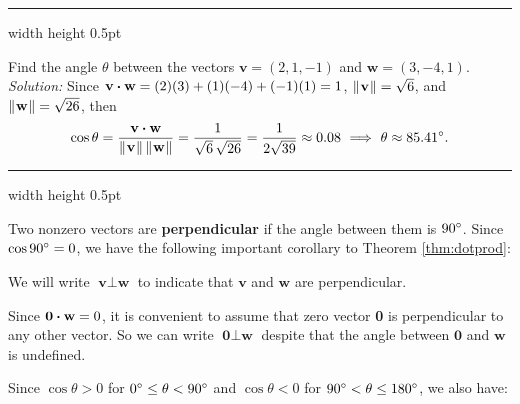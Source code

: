 \hrule width \textwidth height 0.5pt
\begin{exmp}
 Find the angle $\theta$ between the vectors $\textbf{v} = (2,1,-1)$ and $\textbf{w} =
 (3,-4,1)$.\smallskip
 \\\emph{Solution:}
 Since $\textbf{v} \bm{\cdot} \textbf{w} = (2)(3) + (1)(-4) + (-1)(1) = 1$,
 $\lVert\mspace{1mu}\textbf{v}\mspace{1mu}\rVert = \sqrt{6}$, and $\lVert\mspace{1mu}\textbf{w}\mspace{1mu}\rVert = \sqrt{26}$, then
 \begin{displaymath}
  \cos \theta = \frac{\textbf{v} \bm{\cdot} \textbf{w}}{\lVert\mspace{1mu}\textbf{v}\mspace{1mu}\rVert \, \lVert\mspace{1mu}\textbf{w}\mspace{1mu}\rVert} =
  \frac{1}{\sqrt{6}\,\sqrt{26}} = \frac{1}{2 \sqrt{39}} \approx 0.08 ~ \Longrightarrow ~ \theta \approx 85.41^\circ.
 \end{displaymath}
\end{exmp}
\hrule width \textwidth height 0.5pt
\smallskip

Two nonzero vectors are \textbf{perpendicular} if the angle between them is $90^\circ$.
Since $\cos 90^\circ = 0$, we have the following important corollary to Theorem \ref{thm:dotprod}:


We will write $\textbf{v} \perp \textbf{w}$ to indicate that $\textbf{v}$ and $\textbf{w}$ are perpendicular.

Since $\textbf{0} \bm{\cdot} \textbf{w} =
 0$, it is convenient to assume that zero vector \textbf{0} is perpendicular to any other vector. 
So we can write  $\textbf{0} \perp \textbf{w}$ despite that the angle between $\textbf{0}$ and $\textbf{w}$ is undefined.

Since $\cos \theta > 0$ for $0^\circ \le \theta < 90^\circ$ and $\cos \theta < 0$ for
$90^\circ < \theta \le 180^\circ$, we also have:


